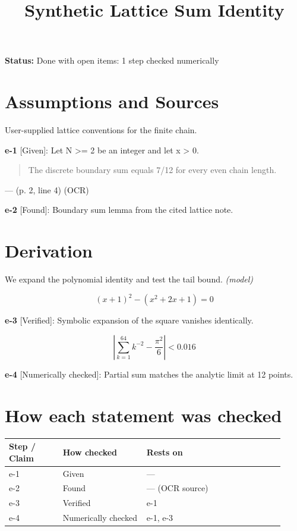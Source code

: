 \documentclass[11pt]{article}
\title{Synthetic Lattice Sum Identity}
\date{}
\begin{document}
\maketitle

\noindent\textbf{Status:} Done with open items: 1 step checked numerically\\

\section{Assumptions and Sources}
\label{sec:setup}

User-supplied lattice conventions for the finite chain.

\noindent\textbf{e-1} [Given]: Let N >= 2 be an integer and let x > 0.

\begin{quote}
The discrete boundary sum equals 7/12 for every even chain length.
\end{quote}
\noindent --- \cite{voss2024lattice} (p. 2, line 4) (OCR)

\noindent\textbf{e-2} [Found]: Boundary sum lemma from the cited lattice note.

\section{Derivation}
\label{sec:derivation}

We expand the polynomial identity and test the tail bound. \textit{(model)}

\begin{equation}
\label{eq:poly}
(x + 1)^2 - (x^2 + 2x + 1) = 0
\end{equation}

\noindent\textbf{e-3} [Verified]: Symbolic expansion of the square vanishes identically.

\[
\left|\sum_{k=1}^{64} k^{-2} - \frac{\pi^2}{6}\right| < 0.016
\]

\noindent\textbf{e-4} [Numerically checked]: Partial sum matches the analytic limit at 12 points.

\section*{How each statement was checked}

\begin{tabular}{p{0.18\linewidth}p{0.28\linewidth}p{0.46\linewidth}}
\toprule
Step / Claim & How checked & Rests on \\
\midrule
e-1 & Given & --- \\
e-2 & Found & --- (OCR source) \\
e-3 & Verified & e-1 \\
e-4 & Numerically checked & e-1, e-3 \\
\bottomrule
\end{tabular}



\end{document}
